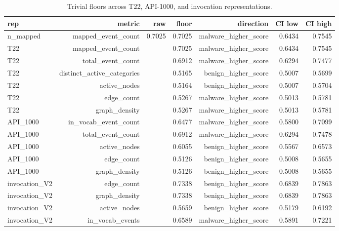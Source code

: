 \begin{table}[ht]
\centering
\caption{Trivial floors across T22, API-1000, and invocation representations.}
\label{tab:t2-floors}
\begin{tabular}{lrrrrrr}
\toprule
rep & metric & raw & floor & direction & CI low & CI high \\
\midrule
n_mapped & mapped_event_count & 0.7025 & 0.7025 & malware\_higher\_score & 0.6434 & 0.7545 \\
T22 & mapped_event_count &  & 0.7025 & malware\_higher\_score & 0.6434 & 0.7545 \\
T22 & total_event_count &  & 0.6912 & malware\_higher\_score & 0.6294 & 0.7477 \\
T22 & distinct_active_categories &  & 0.5165 & benign\_higher\_score & 0.5007 & 0.5699 \\
T22 & active_nodes &  & 0.5164 & benign\_higher\_score & 0.5007 & 0.5704 \\
T22 & edge_count &  & 0.5267 & malware\_higher\_score & 0.5013 & 0.5781 \\
T22 & graph_density &  & 0.5267 & malware\_higher\_score & 0.5013 & 0.5781 \\
API_1000 & in_vocab_event_count &  & 0.6477 & malware\_higher\_score & 0.5800 & 0.7099 \\
API_1000 & total_event_count &  & 0.6912 & malware\_higher\_score & 0.6294 & 0.7478 \\
API_1000 & active_nodes &  & 0.6055 & benign\_higher\_score & 0.5567 & 0.6573 \\
API_1000 & edge_count &  & 0.5126 & benign\_higher\_score & 0.5008 & 0.5655 \\
API_1000 & graph_density &  & 0.5126 & benign\_higher\_score & 0.5008 & 0.5655 \\
invocation_V2 & edge_count &  & 0.7338 & benign\_higher\_score & 0.6839 & 0.7863 \\
invocation_V2 & graph_density &  & 0.7338 & benign\_higher\_score & 0.6839 & 0.7863 \\
invocation_V2 & active_nodes &  & 0.5659 & benign\_higher\_score & 0.5179 & 0.6192 \\
invocation_V2 & in_vocab_events &  & 0.6589 & malware\_higher\_score & 0.5891 & 0.7221 \\
\bottomrule
\end{tabular}
\end{table}
